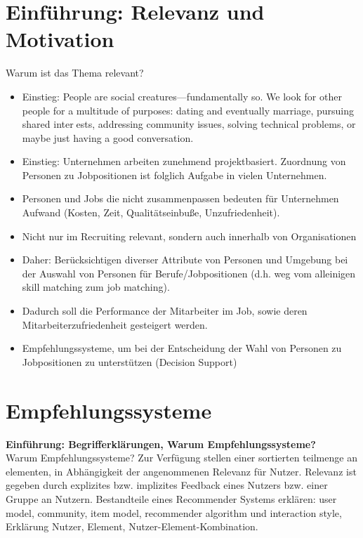 \newpage

\section{Einführung: Relevanz und Motivation}
\label{ch:notizen:relevanzMotivation}
Warum ist das Thema relevant?
\begin{itemize}
    \item Einstieg: People are social creatures—fundamentally so. We look for other people for a multitude of purposes: dating and eventually marriage, pursuing shared interests, addressing community issues, solving technical problems, or maybe just having a good conversation.%
    \item Einstieg: Unternehmen arbeiten zunehmend projektbasiert. Zuordnung von Personen zu Jobpositionen ist folglich Aufgabe in vielen Unternehmen.
    \item Personen und Jobs die nicht zusammenpassen bedeuten für Unternehmen Aufwand (Kosten, Zeit, Qualitätseinbuße, Unzufriedenheit).
    \item Nicht nur im Recruiting relevant, sondern auch innerhalb von Organisationen %
    \item Daher: Berücksichtigen diverser Attribute von Personen und Umgebung bei der Auswahl von Personen für Berufe/Jobpositionen (d.h. weg vom alleinigen skill matching zum job matching).
    \item Dadurch soll die Performance der Mitarbeiter im Job, sowie deren Mitarbeiterzufriedenheit gesteigert werden.
    \item Empfehlungssysteme, um bei der Entscheidung der Wahl von Personen zu Jobpositionen zu unterstützen (Decision Support) %
\end{itemize}

\section{Empfehlungssysteme}
\textbf{Einführung: Begrifferklärungen, Warum Empfehlungssysteme?}\\
Warum Empfehlungssysteme? Zur Verfügung stellen einer sortierten teilmenge an elementen, in Abhängigkeit der angenommenen Relevanz für Nutzer. %
Relevanz ist gegeben durch explizites bzw. implizites Feedback eines Nutzers bzw. einer Gruppe an Nutzern. %
Bestandteile eines Recommender Systems erklären: user model, community, item model, recommender algorithm und interaction style, Erklärung Nutzer, Element, Nutzer-Element-Kombination.\\ %

